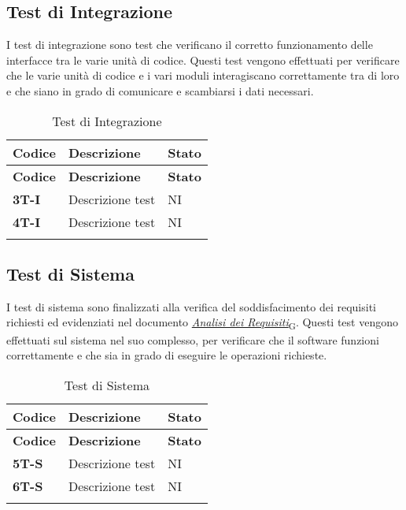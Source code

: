 \subsection{Test di Integrazione}
I test di integrazione sono test che verificano il corretto funzionamento delle interfacce tra le varie unità di codice. Questi test vengono effettuati per verificare che le varie unità di codice e i vari moduli interagiscano correttamente tra di loro e che siano in grado di comunicare e scambiarsi i dati necessari. \\
\begin{longtable}{|>{\raggedright\arraybackslash}m{}|>{\raggedright\arraybackslash}m{}|>{\raggedright\arraybackslash}m{}|}
	\hline
	\textbf{Codice} & \textbf{Descrizione} & \textbf{Stato} \\
	\hline
	\endfirsthead
	\hline
	\textbf{Codice} & \textbf{Descrizione} & \textbf{Stato} \\
	\endhead
	\textbf{3T-I}   & Descrizione test     & NI             \\
	\hline
	\textbf{4T-I}   & Descrizione test     & NI             \\
	\hline
	\caption{Test di Integrazione} %
	\label{table:13}
\end{longtable}

\subsection{Test di Sistema}
I test di sistema sono finalizzati alla verifica del soddisfacimento dei requisiti richiesti ed evidenziati nel documento \href{https://7last.github.io/docs/rtb/documentazione-esterna/analisi-dei-requisiti}{\href{https://7last.github.io/docs/rtb/documentazione-interna/glossario\#analisi-dei-requisiti}{\textit{Analisi dei Requisiti}\textsubscript{G}}}. Questi test vengono effettuati sul sistema nel suo complesso, per verificare che il software funzioni correttamente e che sia in grado di eseguire le operazioni richieste. \\
\begin{longtable}{|>{\raggedright\arraybackslash}m{}|>{\raggedright\arraybackslash}m{}|>{\raggedright\arraybackslash}m{}|}
	\hline
	\textbf{Codice} & \textbf{Descrizione} & \textbf{Stato} \\
	\hline
	\endfirsthead
	\hline
	\textbf{Codice} & \textbf{Descrizione} & \textbf{Stato} \\
	\endhead
	\textbf{5T-S}   & Descrizione test     & NI             \\
	\hline
	\textbf{6T-S}   & Descrizione test     & NI             \\
	\hline
	\caption{Test di Sistema} %
	\label{table:14}
\end{longtable}

